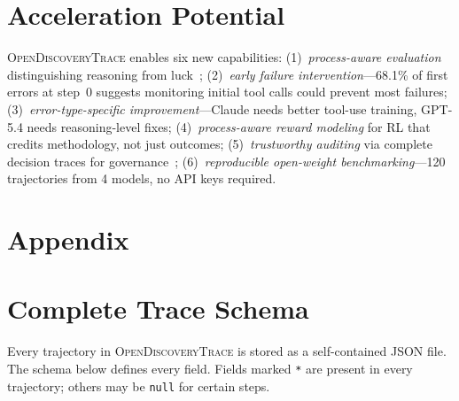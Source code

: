 \documentclass{article}
\newcommand{\dataset}{\textsc{OpenDiscoveryTrace}\xspace}
\begin{document}
\vspace{-0.3em}
\section{Acceleration Potential}
\vspace{-0.3em}

\dataset enables six new capabilities: (1)~\emph{process-aware evaluation} distinguishing reasoning from luck~\citep{wang2023scientific,gil2014amplify}; (2)~\emph{early failure intervention}---68.1\% of first errors at step~0 suggests monitoring initial tool calls could prevent most failures; (3)~\emph{error-type-specific improvement}---Claude needs better tool-use training, GPT-5.4 needs reasoning-level fixes; (4)~\emph{process-aware reward modeling} for RL that credits methodology, not just outcomes; (5)~\emph{trustworthy auditing} via complete decision traces for governance~\citep{king2009automation,kitano2021nobel}; (6)~\emph{reproducible open-weight benchmarking}---120 trajectories from 4 models, no API keys required.

\clearpage



\clearpage
\onecolumn
\appendix
\section*{Appendix}
\setcounter{section}{0}
\renewcommand{\thesection}{\Alph{section}}

\section{Complete Trace Schema}
\label{app:schema}

Every trajectory in \dataset is stored as a self-contained JSON file.
The schema below defines every field. Fields marked \texttt{*} are present in every trajectory; others may be \texttt{null} for certain steps.
\end{document}
